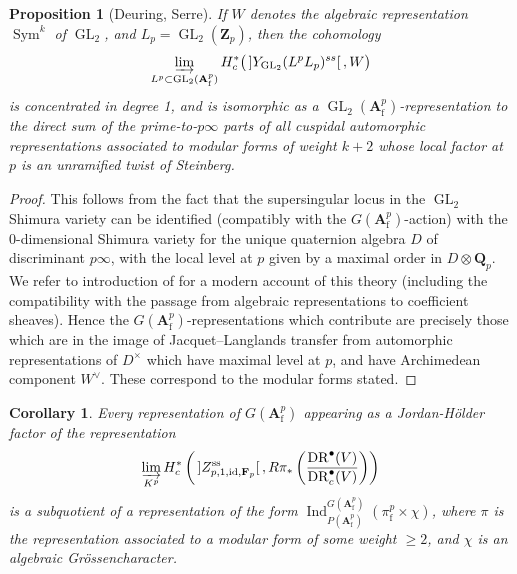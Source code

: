 \documentclass[cjm]{ipart}
\theoremstyle{plain}
\newtheorem{proposition}[theorem]{Proposition}
\newtheorem{corollary}[theorem]{Corollary}
\theoremstyle{remark}
\DeclareMathOperator{\DR}{DR}
\DeclareMathOperator{\GL}{GL}
\DeclareMathOperator{\Sym}{Sym}
\DeclarePairedDelimiter{\tb}{{\,]}}{{[\, }} %
\newcommand{\Af}{\AA_{\mathrm{f}}}
\newcommand{\Fp}{\mathbf{F}_p}
\newcommand{\QQ}{\mathbf{Q}}
\newcommand{\Qp}{\QQ_p}
\newcommand{\Zp}{\mathbf{Z}_p}
\renewcommand{\AA}{\mathbf{A}}
\numberwithin{equation}{subsection}
\renewcommand{\ge}{\geqslant}
\begin{document}
  \begin{proposition}[Deuring, Serre]
   If $W$ denotes the algebraic representation $\Sym^k$ of $\GL_2$, and $L_p = \GL_2(\Zp)$, then the cohomology
   \[ \varinjlim_{L^p \subset \GL_2(\Af^p)} H^*_c\big( \tb{Y_{\GL_2}(L^p L_p)^{ss}}, W\big)\]
   is concentrated in degree 1, and is isomorphic as a $\GL_2(\Af^p)$-representation to the direct sum of the prime-to-$p\infty$ parts of all cuspidal automorphic representations associated to modular forms of weight $k + 2$ whose local factor at $p$ is an unramified twist of Steinberg.
  \end{proposition}
  
  \begin{proof}
   This follows from the fact that the supersingular locus in the $\GL_2$ Shimura variety can be identified (compatibly with the $G(\Af^p)$-action) with the 0-dimensional Shimura variety for the unique quaternion algebra $D$ of discriminant $p\infty$, with the local level at $p$ given by a maximal order in $D \otimes \Qp$. We refer to introduction of \cite{tianxiao16} for a modern account of this theory (including the compatibility with the passage from algebraic representations to coefficient sheaves). Hence the $G(\Af^p)$-representations which contribute are precisely those which are in the image of Jacquet--Langlands transfer from automorphic representations of $D^\times$ which have maximal level at $p$, and have Archimedean component $W^\vee$. These correspond to the modular forms stated.
  \end{proof}
  
  \begin{corollary}
   Every representation of $G(\Af^p)$ appearing as a Jordan-H\"older factor of the representation
   \[ \varinjlim_{K^p} H^*_{c}\left(\tb{Z_{p, 1, \mathrm{id}, \Fp}^{\mathrm{ss}}}, R\pi_*\left( \frac{\DR^\bullet(V)}{\DR^\bullet_c(V)} \right)\right)\]
   is a subquotient of a representation of the form $\operatorname{Ind}_{P(\Af^p)}^{G(\Af^p)}\left(\pi_{\mathrm{f}}^p \times \chi\right)$, where $\pi$ is the representation associated to a modular form of some weight $\ge 2$, and $\chi$ is an algebraic Gr\"ossencharacter.
  \end{corollary}
  
\end{document}
